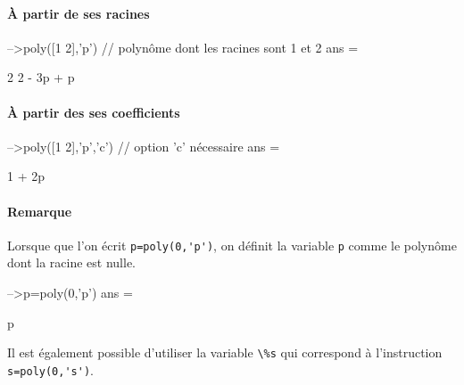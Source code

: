 \paragraph{\`A partir de ses racines}
\begin{Scilabcode}
-->poly([1 2],'p')    // polynôme dont les racines sont 1 et 2
 ans  =
 
              2  
    2 - 3p + p 
\end{Scilabcode}
\paragraph{\`A partir des ses coefficients}
\begin{Scilabcode}
-->poly([1 2],'p','c')    // option 'c' nécessaire
 ans  =
 
    1 + 2p
\end{Scilabcode}
\paragraph{Remarque}
Lorsque que l'on écrit \verb?p=poly(0,'p')?, on définit la variable \verb?p? 
comme le polynôme dont la racine est nulle.
\begin{Scilabcode}
-->p=poly(0,'p')
 ans  =

    p
\end{Scilabcode}
Il est également possible d'utiliser la variable \verb?\%s? qui correspond
à l'instruction \verb?s=poly(0,'s')?.
\newpage
